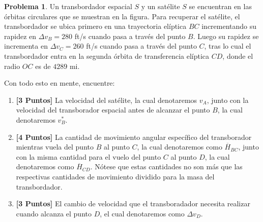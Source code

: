 \documentclass[ a4paper, twoside, 11pt]{article}
\theoremstyle{definition}
\newtheorem{problem}[definition]{Problema}
\begin{document}
\begin{problem}
Un transbordador espacial $S$ y un sat\'elite $S$ se encuentran en las \'orbitas circulares que se muestran en la figura. Para recuperar el sat\'elite, el transbordador se ubica primero en una trayectoria el\'iptica $BC$ incrementando su rapidez en $\Delta v_B = 280$ ft/s cuando pasa a trav\'es del punto $B$. Luego su rapidez se incrementa en $\Delta v_C = 260$ ft/s cuando pasa a trav\'es del punto $C$, tras lo cual el transbordador entra en la segunda \'orbita de transferencia el\'iptica $CD$, donde el radio $OC$ es de $4289$ mi. 

Con todo esto en mente, encuentre: 
\begin{enumerate}[label=\alph*.]
\item \textbf{[3 Puntos]} La velocidad del sat\'elite, la cual denotaremos $v_A$, junto con la velocidad del transborador espacial antes de alcanzar el punto $B$, la cual denotaremos $v_B^*$. 
\item \textbf{[4 Puntos]} La cantidad de movimiento angular espec\'ifico del transborador mientras vuela del punto $B$ al punto $C$, la cual denotaremos como $\overline{H}_{BC}$, junto con la misma cantidad para el vuelo del punto $C$ al punto $D$, la cual denotaremos como $\overline{H}_{CD}$. N\'otese que estas cantidades no son m\'as que las respectivas cantidades de movimiento dividido para la masa del transbordador. 
\item \textbf{[3 Puntos]} El cambio de velocidad que el transboradador necesita realizar cuando alcanza el punto $D$, el cual denotaremos como $\Delta v_D$. 
\end{enumerate}

\end{problem}
\vspace{\baselineskip}
\end{document}
